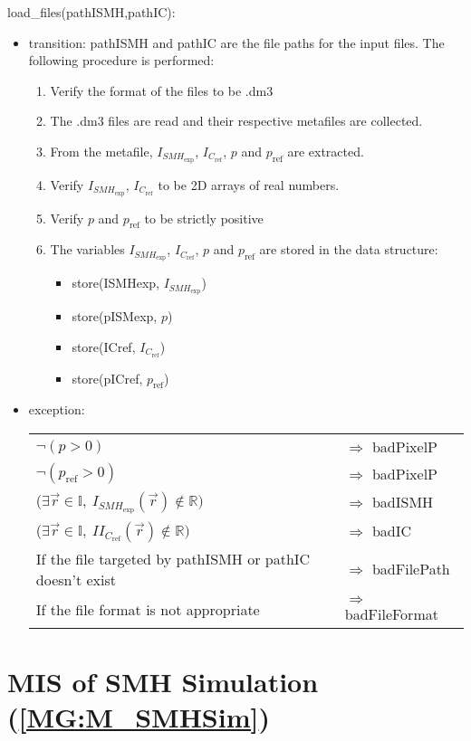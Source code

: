 \documentclass[12pt, titlepage]{article}
\begin{document}
\noindent load{\_}files(pathISMH,pathIC):
\begin{itemize}
\item transition: pathISMH and pathIC are the file paths for the input files. The following procedure is performed:
\begin{enumerate}
\item Verify the format of the files to be .dm3
\item The .dm3 files are read and their respective  metafiles are collected.
\item From the metafile, $I_{\mathit{SMH}_{\text{exp}}}$, $I_{C_{\text{ref}}}$, $p$ and $p_{\text{ref}}$ are extracted.
\item Verify $I_{\mathit{SMH}_{\text{exp}}}$, $I_{C_{\text{ref}}}$ to be 2D arrays of real numbers.
\item Verify  $p$ and $p_{\text{ref}}$ to be strictly positive
\item The variables $I_{\mathit{SMH}_{\text{exp}}}$, $I_{C_{\text{ref}}}$, $p$ and $p_{\text{ref}}$ are stored in the data structure:
\begin{itemize}
\item store(ISMHexp, $I_{\mathit{SMH}_{\text{exp}}}$)
\item store(pISMexp, $p$)
\item store(ICref, $I_{C_{\text{ref}}}$)
\item store(pICref, $p_{\text{ref}}$)
\end{itemize}
\end{enumerate}   
\item exception:
\noindent \begin{longtable*}[l]{l l} 
$\neg (p > 0)$ & $\Rightarrow$ badPixelP\\
$\neg (p_{\text{ref}} > 0)$ & $\Rightarrow$ badPixelP\\
($\exists \vec{r} \in \mathbb{I}, \ I_{\mathit{SMH}_{\text{exp}}}(\vec{r}) \notin \mathbb{R})$ & $\Rightarrow$ badISMH\\
($\exists \vec{r} \in \mathbb{I}, \ II_{C_{\text{ref}}}(\vec{r}) \notin \mathbb{R})$ & $\Rightarrow$ badIC\\
If the file targeted by pathISMH or pathIC doesn't exist & $\Rightarrow$ badFilePath\\
If the file format is not appropriate & $\Rightarrow$ badFileFormat\\
\end{longtable*}
\end{itemize}

\section{MIS of SMH Simulation (\texorpdfstring{\cref{MG:M_SMHSim}}))} \label{MIS_SMHSim}
\end{document}
